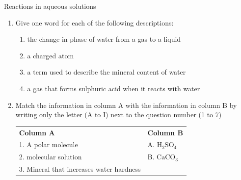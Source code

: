\label{m38719*eip-896}
            \begin{eocexercises}{Reactions in aqueous solutions}
            \nopagebreak
            \label{m38719*id342869}\begin{enumerate}[noitemsep, label=\textbf{\arabic*}. ] 
            \label{m38719*uid107}\item Give one word for each of the following descriptions:
\label{m38719*id342885}\begin{enumerate}[noitemsep, label=\textbf{\alph*}. ] 
            \label{m38719*uid108}\item the change in phase of water from a gas to a liquid
\label{m38719*uid109}\item a charged atom
\label{m38719*uid110}\item a term used to describe the mineral content of water
\label{m38719*uid111}\item a gas that forms sulphuric acid when it reacts with water
\end{enumerate}
\label{m38719*uid112}\item Match the information in column A with the information in column B by writing only the letter (A to I) next to the question number (1 to 7)
          \begin{table}[H]
        \begin{center}
      \label{m38719*id342952}
    \noindent
      \tablelasttail{}
      \begin{xtabular}[t]{|l|l|}\hline
        \textbf{Column A} &
        \textbf{Column B}%
     \tabularnewline{}
        1. A polar molecule &
        A. ${\mathrm{H}}_{2}{\mathrm{SO}}_{4}$%
     \tabularnewline{}
        2. molecular solution &
        B. ${\mathrm{CaCO}}_{3}$%
     \tabularnewline{}
        3. Mineral that increases water hardness &

\end{xtabular}
\end{center}
\end{table}
\end{enumerate}
\end{eocexercises}
